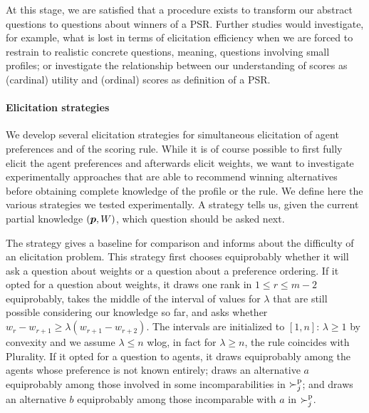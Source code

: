 \documentclass{article}
\begin{document}
At this stage, we are satisfied that a procedure exists to transform our abstract questions to questions about winners of a PSR. Further studies would investigate, for example, what is lost in terms of elicitation efficiency when we are forced to restrain to realistic concrete questions, meaning, questions involving small profiles; or investigate the relationship between our understanding of scores as (cardinal) utility and (ordinal) scores as definition of a PSR.

\paragraph{Elicitation strategies}
We develop several elicitation strategies for simultaneous elicitation of agent preferences and of the scoring rule.
While it is of course possible to first fully elicit the agent preferences and afterwards elicit weights, we want to investigate experimentally approaches that are able to recommend winning alternatives before obtaining complete knowledge of the profile or the rule.
We define here the various strategies we tested experimentally. A strategy tells us, given the current partial knowledge $({\bm{p}}, W)$, which question should be asked next.

The  strategy gives a baseline for comparison and informs about the difficulty of an elicitation problem. 
This strategy first chooses equiprobably whether it will ask a question about weights or a question about a preference ordering. If it opted for a question about weights, it draws one rank in $1 ≤ r ≤ m-2$ equiprobably, takes the middle of the interval of values for $\lambda$ that are still possible considering our knowledge so far, and asks whether $w_r - w_{r+1} ≥ \lambda (w_{r+1} - w_{r+2})$. The intervals are initialized to $[1, n]$: $\lambda≥1$ by convexity and we assume $\lambda≤n$ wlog, in fact for $\lambda≥n$, the rule coincides with Plurality. If it opted for a question to agents, it draws equiprobably among the agents whose preference is not known entirely; draws an alternative $a$ equiprobably among those involved in some incomparabilities in $\succ^\text{p}_j$; and draws an alternative $b$ equiprobably among those incomparable with $a$ in $\succ^\text{p}_j$.
\end{document}
